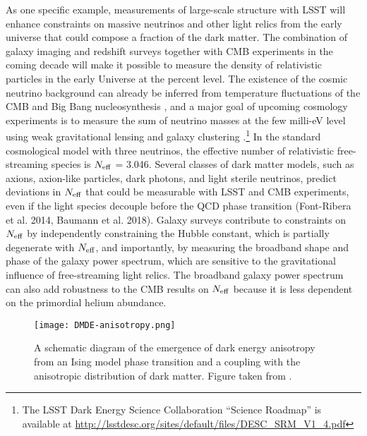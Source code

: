 As one specific example, measurements of large-scale structure with LSST will enhance constraints on massive neutrinos and other light relics from the early universe that could compose a fraction of the dark matter. The combination of galaxy imaging and redshift surveys together with CMB experiments in the coming decade will make it possible to measure the density of relativistic particles in the early Universe at the percent level. The existence of the cosmic neutrino background can already be inferred from temperature fluctuations of the CMB \citep{Planck:2018_cosmo_params} and Big Bang nucleosynthesis \citep{Cooke:2018}, and a major goal of upcoming cosmology experiments is to measure the sum of neutrino masses at the few milli-eV level using weak gravitational lensing and galaxy clustering \citep[e.g.,][]{CMB-S4:2016,DESI:2016,Mishra-Sharma:2018}.\footnote{The LSST Dark Energy Science Collaboration ``Science Roadmap'' is available at \url{http://lsstdesc.org/sites/default/files/DESC_SRM_V1_4.pdf}} In the standard cosmological model with three neutrinos, the effective number of relativistic free-streaming species is $N_{\rm eff}$ = 3.046. Several classes of dark matter models, such as axions, axion-like particles, dark photons, and light sterile neutrinos, predict deviations in $N_{\rm eff}$ that could be measurable with LSST and CMB experiments, even if the light species decouple before the QCD phase transition (Font-Ribera et al. 2014, Baumann et al. 2018). Galaxy surveys contribute to constraints on $N_{\rm eff}$ by independently constraining the Hubble constant, which is partially degenerate with $N_{\rm eff}$, and importantly, by measuring the broadband shape and phase of the galaxy power spectrum, which are sensitive to the gravitational influence of free-streaming light relics. The broadband galaxy power spectrum can also add robustness to the CMB results on $N_{\rm eff}$ because it is less dependent on the primordial helium abundance.

\begin{figure}[t]
\centering
\texttt{[image: DMDE-anisotropy.png]}
\caption{A schematic diagram of the emergence of dark energy anisotropy from an Ising model phase transition and a coupling with the anisotropic distribution of dark matter. Figure taken from \citet{1810.11007}.}
\label{fig:DMDEmap}
\end{figure}

